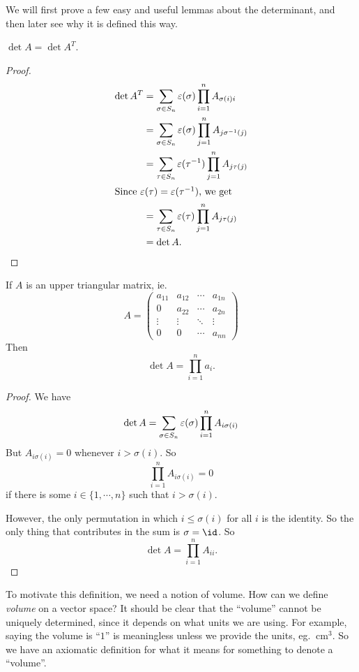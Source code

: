 \documentclass[a4paper]{article}
\begin{document}
We will first prove a few easy and useful lemmas about the determinant, and then later see why it is defined this way.
\begin{lemma}
  $\det A = \det A^T$.
\end{lemma}

\begin{proof}
  \begin{align*}
    \det A^T &= \sum_{\sigma \in S_n} \varepsilon(\sigma) \prod_{i = 1}^n A_{\sigma(i)i}\\
    &= \sum_{\sigma \in S_n} \varepsilon (\sigma) \prod_{j = 1}^n A_{j \sigma^{-1}(j)}\\
    &= \sum_{\tau \in S_n} \varepsilon (\tau^{-1}) \prod_{j = 1}^n A_{j \tau (j)}\\
    \intertext{Since $\varepsilon(\tau) = \varepsilon(\tau^{-1})$, we get}
    &= \sum_{\tau \in S_n} \varepsilon (\tau) \prod_{j = 1}^n A_{j \tau (j)}\\
    &= \det A.
  \end{align*}
\end{proof}

\begin{lemma}
  If $A$ is an upper triangular matrix, ie.
  \[
    A = 
    \begin{pmatrix}
      a_{11} & a_{12} & \cdots & a_{1n}\\
      0 & a_{22} & \cdots & a_{2n}\\
      \vdots & \vdots & \ddots & \vdots\\
      0 & 0 & \cdots & a_{nn}
    \end{pmatrix}
  \]
  Then
  \[
    \det A = \prod_{i = 1}^n a_i.
  \]
\end{lemma}

\begin{proof}
  We have
  \[
    \det A = \sum_{\sigma \in S_n} \varepsilon(\sigma) \prod_{i = 1}^n A_{i\sigma (i)}\\
  \]
  But $A_{i \sigma(i)} = 0$ whenever $i > \sigma(i)$. So
  \[
    \prod_{i = 1}^n A_{i\sigma(i)} = 0
  \]
  if there is some $i \in \{1, \cdots, n\}$ such that $i > \sigma(i)$.

  However, the only permutation in which $i \leq \sigma(i)$ for all $i$ is the identity. So the only thing that contributes in the sum is $\sigma = \id$. So
  \[
    \det A = \prod_{i = 1}^n A_{ii}.
  \]
\end{proof}
To motivate this definition, we need a notion of volume. How can we define \emph{volume} on a vector space? It should be clear that the ``volume'' cannot be uniquely determined, since it depends on what units we are using. For example, saying the volume is ``$1$'' is meaningless unless we provide the units, eg. $\SI{}{\centi\meter\cubed}$. So we have an axiomatic definition for what it means for something to denote a ``volume''.
\end{document}
